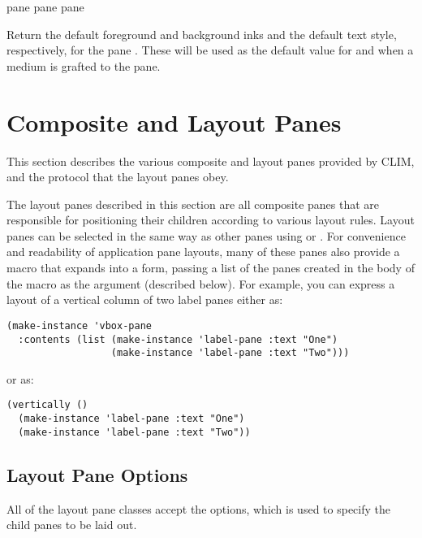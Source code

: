  {pane}
 {pane}
 {pane}

Return the default foreground and background inks and the default text style,
respectively, for the pane .  These will be used as the default value
for  and  when a medium is grafted
to the pane.


\section {Composite and Layout Panes}

This section describes the various composite and layout panes provided by CLIM,
and the protocol that the layout panes obey.

The layout panes described in this section are all composite panes that are
responsible for positioning their children according to various layout rules.
Layout panes can be selected in the same way as other panes using 
or .  For convenience and readability of application pane
layouts, many of these panes also provide a macro that expands into a
 form, passing a list of the panes created in the body of the
macro as the  argument (described below).  For example, you can
express a layout of a vertical column of two label panes either as:

\begin{verbatim}
(make-instance 'vbox-pane
  :contents (list (make-instance 'label-pane :text "One")
                  (make-instance 'label-pane :text "Two")))
\end{verbatim}

or as:

\begin{verbatim}
(vertically ()
  (make-instance 'label-pane :text "One")
  (make-instance 'label-pane :text "Two"))
\end{verbatim}


\subsection {Layout Pane Options}


All of the layout pane classes accept the  options, which is used
to specify the child panes to be laid out.


